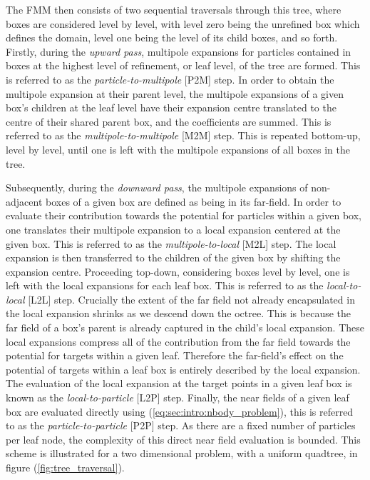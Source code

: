 \documentclass{IEEEcsmag}
\begin{document}
The FMM then consists of two sequential traversals through this tree, where boxes are considered level by level, with level zero being the unrefined box which defines the domain, level one being the level of its child boxes, and so forth. Firstly, during the \textit{upward pass}, multipole expansions for particles contained in boxes at the highest level of refinement, or leaf level, of the tree are formed. This is referred to as the \textit{particle-to-multipole} [P2M] step. In order to obtain the multipole expansion at their parent level, the multipole expansions of a given box's children at the leaf level have their expansion centre translated to the centre of their shared parent box, and the coefficients are summed. This is referred to as the \textit{multipole-to-multipole} [M2M] step. This is repeated bottom-up, level by level, until one is left with the multipole expansions of all boxes in the tree.

Subsequently, during the \textit{downward pass}, the multipole expansions of non-adjacent boxes of a given box are defined as being in its far-field. In order to evaluate their contribution towards the potential for particles within a given box, one translates their multipole expansion to a local expansion centered at the given box. This is referred to as the \textit{multipole-to-local} [M2L] step. The local expansion is then transferred to the children of the given box by shifting the expansion centre. Proceeding top-down, considering boxes level by level, one is left with the local expansions for each leaf box. This is referred to as the \textit{local-to-local} [L2L] step. Crucially the extent of the far field not already encapsulated in the local expansion shrinks as we descend down the octree. This is because the far field of a box's parent is already captured in the child's local expansion. These local expansions compress all of the contribution from the far field towards the potential for targets within a given leaf. Therefore the far-field's effect on the potential of targets within a leaf box is entirely described by the local expansion. The evaluation of the local expansion at the target points in a given leaf box is known as the \textit{local-to-particle} [L2P] step. Finally, the near fields of a given leaf box are  evaluated directly using (\ref{eq:sec:intro:nbody_problem}), this is referred to as the \textit{particle-to-particle} [P2P] step. As there are a fixed number of particles per leaf node, the complexity of this direct near field evaluation is bounded. This scheme is illustrated for a two dimensional problem, with a uniform quadtree, in figure (\ref{fig:tree_traversal}).
\end{document}

